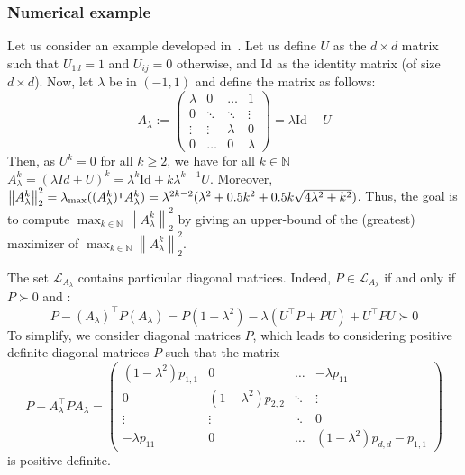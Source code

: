 \documentclass{article}
\def\norm#1{\left\|#1\right\|}
\def\Idd{\mathrm{Id}}
\def\nn{\mathbb N}
\def\lmax#1{\lambda_{\rm max}(#1)}
\def\red#1{#1}
\def\blue#1{#1}
\begin{document}
		\subsubsection{Numerical example}
		Let us consider \red{an} example developed in~\cite{ahiyevich2018upper}. Let us define $U$ as the $d\times d$ matrix such that $U_{1d}=1$ and $U_{ij}=0$ otherwise, and $\Idd$ \red{as} the identity matrix (of size $d\times d$). Now, let $\lambda$ be in $(-1,1)$ and define the matrix \blue{as follows}:
		\[
		A_\lambda:=\begin{pmatrix}
			\lambda & 0 & \ldots & 1\\
			0 & \ddots&\ddots & \vdots \\
			\vdots& \vdots& \lambda& 0\\ 
			0  &\ldots& 0& \lambda 
		\end{pmatrix}=\lambda \Idd + U
		\]
		Then, as $U^k=0$ for all $k\geq 2$, we have for all $k\in\nn$ $A_\lambda^k=(\lambda Id+U)^k=\lambda^k\Idd+k \lambda^{k-1}U$. Moreover, $\norm{A_\lambda^k}_2^2=\lmax{(A_\lambda^k)^\intercal A_\lambda^k}=\lambda^{2k-2}(\lambda^2+0.5k^2+0.5k\sqrt{4\lambda^2+k^2})$. 
		Thus, the goal is to compute $\max_{k\in\nn} \norm{A_\lambda^k}_2^2$ by giving an upper-bound of the (greatest) maximizer of $\max_{k\in\nn} \norm{A_\lambda^k}_2^2$.
		
		\red{The set} $\mathcal{L}_{A_\lambda}$ contains particular diagonal matrices. Indeed,
		$P\in \mathcal{L}_{A_\lambda}$ if and only if $P\succ 0$ and :
		\[
		P-(A_\lambda)^\intercal P (A_\lambda)=P(1-\lambda^2) -\lambda (U^\intercal P+ PU)+U^\intercal P U \succ 0
		\]
		To simplify, we consider diagonal matrices $P$, which leads to \red{considering} positive definite diagonal matrices $P$ such that the matrix
		\[
		P-A_\lambda^\intercal P A_\lambda=\begin{pmatrix}
			(1-\lambda^2)p_{1,1} & 0 & \ldots & -\lambda p_{11}\\
			0& (1-\lambda^2)p_{2,2} & \ddots & \vdots\\
			\vdots & \vdots &  \ddots & 0\\
			-\lambda p_{11} & 0 &\ldots & (1-\lambda^2) p_{d,d}-p_{1,1}
		\end{pmatrix}
		\]
		is positive definite.
		
\end{document}
